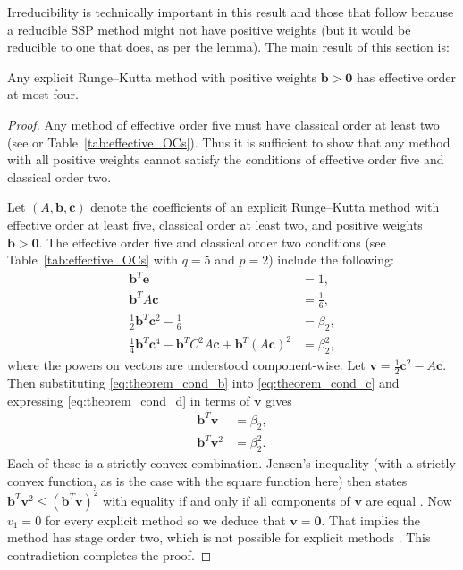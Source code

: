 \documentclass[final]{siamltex}  %
\begin{document}
Irreducibility \cite{dahlquist2006} is technically important in this
result and those that follow because a reducible SSP method might not
have positive weights (but it would be reducible to one that does, as
per the lemma).
The main result of this section is:
\begin{theorem}\label{thm:effective_barrier}
	Any explicit Runge--Kutta method with positive weights $\bm{b} > \bm{0}$ 
	has effective order at most four.
\end{theorem}
\begin{proof}%
	Any method of effective order five must have classical order at least two
	(see \cite{Butcher2008_book} or Table~\ref{tab:effective_OCs}).
    Thus it is sufficient to show that any method with all positive weights
    cannot satisfy the conditions of effective order five and classical order two.

    Let $(A,\bm{b},\bm{c})$ denote the coefficients of an explicit Runge--Kutta method with
    effective order at least five, classical order at least two, and positive 
    weights $\bm{b} > \bm{0}$.
    The effective order five and classical order two conditions
    (see Table~\ref{tab:effective_OCs} with $q=5$ and $p=2$) include the following:
    \begin{subequations}\label{eq:theorem_cond}
    		\begin{align}
    			\bm{b}^T\bm{e} & = 1, \label{eq:theorem_cond_a} \\
             	\bm{b}^TA\bm{c} &= \frac{1}{6}, \label{eq:theorem_cond_b} \\
            	\frac{1}{2}\bm{b}^T\bm{c}^2 - \frac{1}{6} &= \beta_2, \label{eq:theorem_cond_c} \\
            	\frac{1}{4}\bm{b}^T\bm{c}^4 - \bm{b}^TC^2A\bm{c} + \bm{b}^T(A\bm{c})^2 &= \beta_2^2, \label{eq:theorem_cond_d}
        	\end{align}
	\end{subequations}
	where the powers on vectors are understood component-wise. 
	Let $\bm{v} = \frac{1}{2}\bm{c}^2 - A\bm{c}$.
	Then substituting \eqref{eq:theorem_cond_b} into \eqref{eq:theorem_cond_c} and expressing \eqref{eq:theorem_cond_d} in terms of $\bm{v}$ gives
	\begin{align*}
		\bm{b}^T\bm{v} &= \beta_2, \\%
		\bm{b}^T\bm{v}^2 &= \beta_2^2. %
	\end{align*}
  Each of these is a strictly convex combination.
  Jensen's inequality (with a strictly convex function, as is the case with the
  square function here) then states $\bm{b}^T \bm{v}^2 \leq (\bm{b}^T
  \bm{v})^2$ with equality if and only if all components of $\bm{v}$ are equal
  \cite[Theorem 12, pg 31]{Bullen:inequalities}.
  Now $v_1 = 0$ for every explicit method so we deduce that $\bm{v}=\bm{0}$.
  That implies the method has stage order two, which is not possible for
  explicit methods \cite{Ruuth2002}.
  This contradiction completes the proof.
\end{proof}
\end{document}
